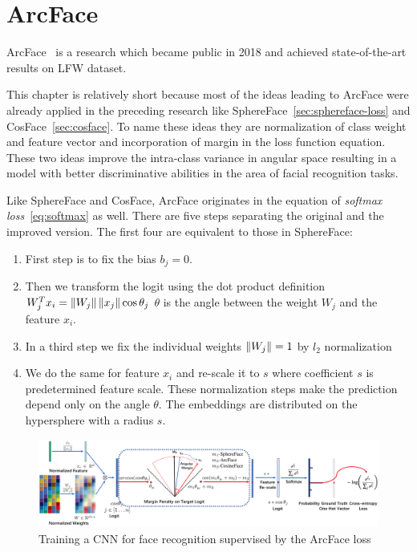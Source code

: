 \chapter{ArcFace}\label{ch:arcface}
ArcFace~\cite{ArcFace} is a research which became public in 2018 and achieved state-of-the-art results on LFW dataset.

This chapter is relatively short because most of the ideas leading to ArcFace were already applied in the preceding
research like SphereFace~\ref{sec:sphereface-loss} and CosFace~\ref{sec:cosface}.
To name these ideas they are normalization of class weight and feature vector and incorporation of margin in the loss
function equation.
These two ideas improve the intra-class variance in angular space resulting in a model with better discriminative
abilities in the area of facial recognition tasks.

Like SphereFace and CosFace, ArcFace originates in the equation of \textit{softmax loss}~\ref{eq:softmax} as well.
There are five steps separating the original and the improved version.
The first four are equivalent to those in SphereFace:
\begin{enumerate}
    \item First step is to fix the bias $b_j = 0$.
    \item Then we transform the logit using the dot product definition $W_j^T x_i = \left\lVert W_j\right\rVert \left\lVert x_j\right\rVert \cos \theta_j$
    $\theta$ is the angle between the weight $W_j$ and the feature $x_i$.
    \item In a third step we fix the individual weights $\left\lVert W_j\right\rVert = 1$ by $l_2$ normalization
    \item We do the same for feature $x_i$ and re-scale it to $s$ where coefficient $s$ is predetermined feature scale.
    These normalization steps make the prediction depend only on the angle $\theta$.
    The embeddings are distributed on the hypersphere with a radius $s$.
\end{enumerate}

\begin{figure}[H]
    \centering
    \includegraphics[width=\columnwidth]{images/arcface/arcface.png}
    \caption{Training a CNN for face recognition supervised by the ArcFace loss~\cite{ArcFace}}
    \label{fig:arcface}
\end{figure}

